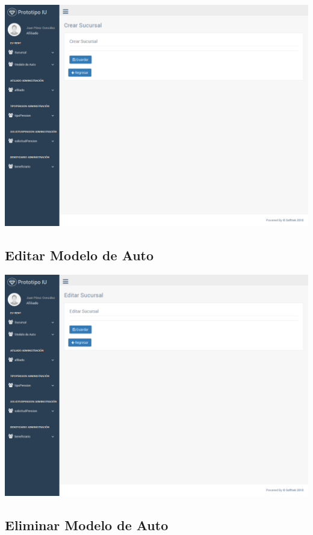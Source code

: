 \documentclass[10pt, letterpaper]{report}
\begin{document}
\includegraphics[width=\linewidth]{ui-prototype/SucursalServices/CrearSucursalPage.png}

\subsection{Editar Modelo de Auto}

\includegraphics[width=\linewidth]{ui-prototype/SucursalServices/EditarSucursalPage.png}

\subsection{Eliminar Modelo de Auto}
\end{document}
